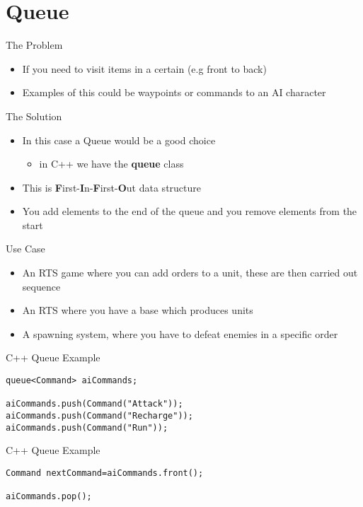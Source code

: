 \part{Queue}
\frame{\partpage}

\begin{frame}{The Problem}
	\begin{itemize}
		\pause \item If you need to visit items in a certain (e.g front to back)
		\pause \item Examples of this could be waypoints or commands to an AI character 
	\end{itemize}
\end{frame}

\begin{frame}{The Solution}
	\begin{itemize}
		\pause \item In this case a Queue would be a good choice
		\begin{itemize}
			\pause \item in C++ we have the \textbf{queue} class
		\end{itemize}
		\pause \item This is \textbf{F}irst-\textbf{I}n-\textbf{F}irst-\textbf{O}ut data structure
		\pause \item You add elements to the end of the queue and you remove elements from the start
	\end{itemize}
\end{frame}

\begin{frame}{Use Case}
	\begin{itemize}
		\pause \item An RTS game where you can add orders to a unit, these are then carried out sequence
		\pause \item An RTS where you have a base which produces units
		\pause \item A spawning system, where you have to defeat enemies in a specific order
	\end{itemize}
\end{frame}

\begin{frame}[fragile]{C++ Queue
Example}
\begin{lstlisting}
queue<Command> aiCommands;

aiCommands.push(Command("Attack"));
aiCommands.push(Command("Recharge"));
aiCommands.push(Command("Run"));
\end{lstlisting}
\end{frame}

\begin{frame}[fragile]{C++ Queue
	Example}
\begin{lstlisting}
Command nextCommand=aiCommands.front();

aiCommands.pop();
\end{lstlisting}
\end{frame}
